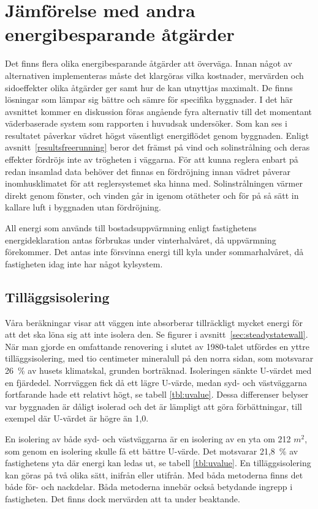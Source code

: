 \section{Jämförelse med andra energibesparande åtgärder}

Det finns flera olika energibesparande åtgärder att överväga. Innan något av alternativen implementeras måste det klargöras vilka kostnader, mervärden och sidoeffekter olika åtgärder ger samt hur de kan utnyttjas maximalt. De finns lösningar som lämpar sig bättre och sämre för specifika byggnader. I det här avsnittet kommer en diskussion föras angående fyra alternativ till det momentant väderbaserade system som rapporten i huvudsak undersöker.
Som kan ses i resultatet påverkar vädret högst väsentligt energiflödet genom byggnaden. Enligt avsnitt~\ref{resultsfreerunning} beror det främst på vind och solinstrålning och deras effekter fördröjs inte av trögheten i väggarna. För att kunna reglera enbart på redan insamlad data behöver det finnas en fördröjning innan vädret påverar inomhusklimatet för att reglersystemet ska hinna med. Solinstrålningen värmer direkt genom fönster, och vinden går in igenom otätheter och för på så sätt in kallare luft i byggnaden utan fördröjning.

All energi som används till bostadsuppvärmning enligt fastighetens energideklaration\cite{energideklaration} antas förbrukas under vinterhalvåret, då uppvärmning förekommer. Det antas inte försvinna energi till kyla under sommarhalvåret, då fastigheten idag inte har något kylsystem.

\subsection{Tilläggsisolering}
Våra beräkningar visar att väggen inte absorberar tillräckligt mycket energi för att det ska löna sig att inte isolera den. Se figurer i avsnitt~\ref{sec:steadystatewall}.
När man gjorde en omfattande renovering i slutet av 1980-talet utfördes en yttre tilläggsisolering, med tio centimeter mineralull på den norra sidan\cite{arsredovisning}, som motsvarar 26~\% av husets klimatskal, grunden borträknad. Isoleringen sänkte U-värdet med en fjärdedel. Norrväggen fick då ett lägre U-värde, medan syd- och västväggarna fortfarande hade ett relativt högt, se tabell \ref{tbl:uvalue}.
Dessa differenser belyser var byggnaden är dåligt isolerad och det är lämpligt att göra förbättningar, till exempel där U-värdet är högre än 1,0.

En isolering av både syd- och västväggarna är en isolering av en yta om 212 $\unit{m^2}$, som genom en isolering skulle få ett bättre U-värde. Det motsvarar 21,8~\% av fastighetens yta där energi kan ledas ut, se tabell \ref{tbl:uvalue}.
En tilläggsisolering kan göras på två olika sätt, inifrån eller utifrån. Med båda metoderna finns det både för- och nackdelar. Båda metoderna innebär också betydande ingrepp i fastigheten. Det finns dock mervärden att ta under beaktande. 

